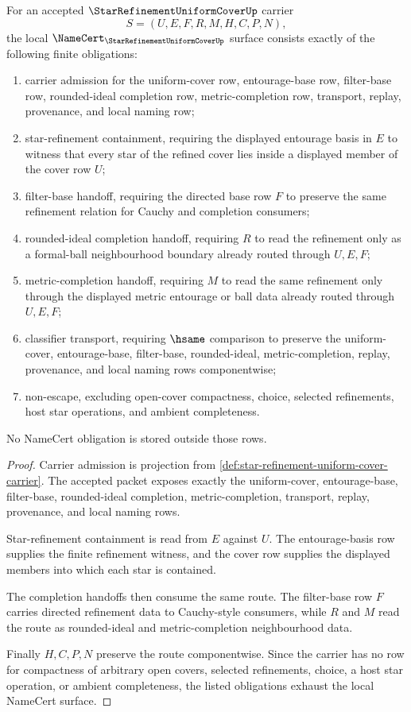 \begin{theorem}
\label{thm:star-refinement-uniform-cover-namecert-obligations}
For an accepted $\StarRefinementUniformCoverUp$ carrier
$$
S=(U,E,F,R,M,H,C,P,N),
$$
the local $\NameCert_{\StarRefinementUniformCoverUp}$ surface consists exactly of the following finite obligations:
\begin{enumerate}
\item carrier admission for the uniform-cover row, entourage-base row, filter-base row, rounded-ideal completion row, metric-completion row, transport, replay, provenance, and local naming row;
\item star-refinement containment, requiring the displayed entourage basis in $E$ to witness that every star of the refined cover lies inside a displayed member of the cover row $U$;
\item filter-base handoff, requiring the directed base row $F$ to preserve the same refinement relation for Cauchy and completion consumers;
\item rounded-ideal completion handoff, requiring $R$ to read the refinement only as a formal-ball neighbourhood boundary already routed through $U,E,F$;
\item metric-completion handoff, requiring $M$ to read the same refinement only through the displayed metric entourage or ball data already routed through $U,E,F$;
\item classifier transport, requiring $\hsame$ comparison to preserve the uniform-cover, entourage-base, filter-base, rounded-ideal, metric-completion, replay, provenance, and local naming rows componentwise;
\item non-escape, excluding open-cover compactness, choice, selected refinements, host star operations, and ambient completeness.
\end{enumerate}
No NameCert obligation is stored outside those rows.
\end{theorem}
\begin{proof}
Carrier admission is projection from \autoref{def:star-refinement-uniform-cover-carrier}. The accepted packet exposes exactly the uniform-cover, entourage-base, filter-base, rounded-ideal completion, metric-completion, transport, replay, provenance, and local naming rows.

Star-refinement containment is read from $E$ against $U$. The entourage-basis row supplies the finite refinement witness, and the cover row supplies the displayed members into which each star is contained.

The completion handoffs then consume the same route. The filter-base row $F$ carries directed refinement data to Cauchy-style consumers, while $R$ and $M$ read the route as rounded-ideal and metric-completion neighbourhood data.

Finally $H,C,P,N$ preserve the route componentwise. Since the carrier has no row for compactness of arbitrary open covers, selected refinements, choice, a host star operation, or ambient completeness, the listed obligations exhaust the local NameCert surface.
\end{proof}

